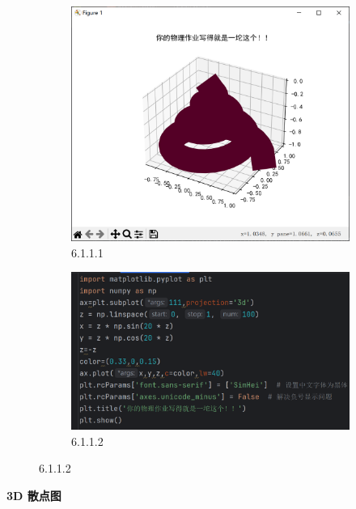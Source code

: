 \documentclass[12pt]{article}
\begin{document}
\begin{figure}[H]
    \centering
    \begin{subfigure}[b]{0.48\textwidth}
        \includegraphics[width=\textwidth]{3D exap Pic1.png} %
        \caption{6.1.1.1}
        \label{fig:line-graph2}
    \end{subfigure}
    \hfill
    \begin{subfigure}[b]{0.48\textwidth}
        \includegraphics[width=\textwidth]{3D exap program1.png} %
        \caption{6.1.1.2}
        \label{fig:line-graph2-pic2}
    \end{subfigure}
\end{figure}

\textbf{\Large 3D 散点图}
\end{document}
